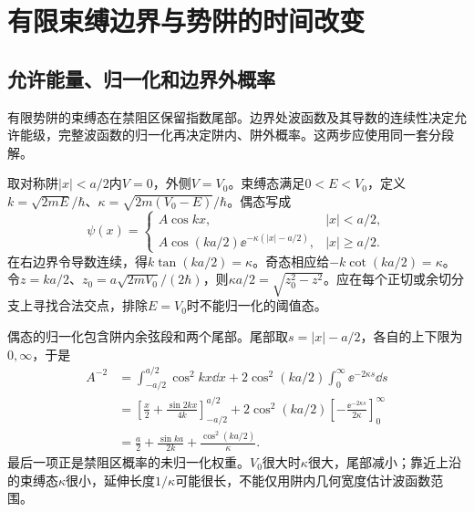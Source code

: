 \section{有限束缚边界与势阱的时间改变}
\subsection{允许能量、归一化和边界外概率}
有限势阱的束缚态在禁阻区保留指数尾部。边界处波函数及其导数的连续性决定允许能级，完整波函数的归一化再决定阱内、阱外概率。这两步应使用同一套分段解。

取对称阱$|x|<a/2$内$V=0$，外侧$V=V_0$。束缚态满足$0<E<V_0$，定义$k=\sqrt{2mE}/\hbar$、$\kappa=\sqrt{2m(V_0-E)}/\hbar$。偶态写成
\[
 \psi(x)=\begin{cases}
 A\cos kx,&|x|<a/2,\\
 A\cos(ka/2)\ee^{-\kappa(|x|-a/2)},&|x|\geq a/2.
 \end{cases}
\]
在右边界令导数连续，得$k\tan(ka/2)=\kappa$。奇态相应给$-k\cot(ka/2)=\kappa$。令$z=ka/2$、$z_0=a\sqrt{2mV_0}/(2\hbar)$，则$\kappa a/2=\sqrt{z_0^2-z^2}$。应在每个正切或余切分支上寻找合法交点，排除$E=V_0$时不能归一化的阈值态。

偶态的归一化包含阱内余弦段和两个尾部。尾部取$s=|x|-a/2$，各自的上下限为$0,\infty$，于是
\begin{align*}
 A^{-2}&=\int_{-a/2}^{a/2}\cos^2kx\dd x
 +2\cos^2(ka/2)\int_0^\infty\ee^{-2\kappa s}\dd s\\
 &=\left[\frac x2+\frac{\sin2kx}{4k}\right]_{-a/2}^{a/2}
 +2\cos^2(ka/2)\left[-\frac{\ee^{-2\kappa s}}{2\kappa}\right]_0^\infty\\
 &=\frac a2+\frac{\sin ka}{2k}+\frac{\cos^2(ka/2)}\kappa.
\end{align*}
最后一项正是禁阻区概率的未归一化权重。$V_0$很大时$\kappa$很大，尾部减小；靠近上沿的束缚态$\kappa$很小，延伸长度$1/\kappa$可能很长，不能仅用阱内几何宽度估计波函数范围。

